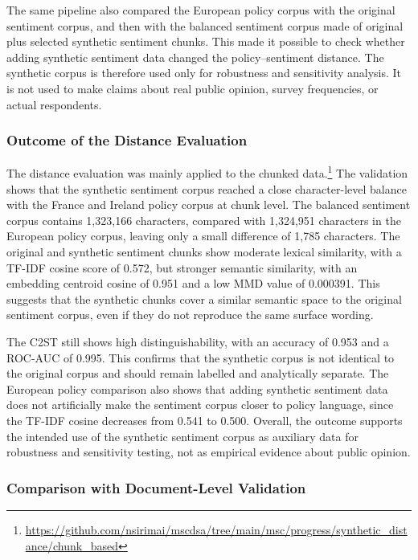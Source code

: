 \documentclass{article}
\begin{document}
The same pipeline also compared the European policy corpus with the original
sentiment corpus, and then with the balanced sentiment corpus made of original plus
selected synthetic sentiment chunks. This made it possible to check whether adding
synthetic sentiment data changed the policy--sentiment distance. The synthetic corpus
is therefore used only for robustness and sensitivity analysis. It is not used to
make claims about real public opinion, survey frequencies, or actual respondents.


\subsubsection*{Outcome of the Distance Evaluation}

The distance evaluation was mainly applied to the chunked
data.\footnote{\url{https://github.com/nsirimai/mscdsa/tree/main/msc/progress/synthetic_distance/chunk_based}}
The validation shows that the synthetic sentiment corpus reached a close
character-level balance with the France and Ireland policy corpus at chunk level. The
balanced sentiment corpus contains 1,323,166 characters, compared with 1,324,951
characters in the European policy corpus, leaving only a small difference of 1,785
characters. The original and synthetic sentiment chunks show moderate lexical
similarity, with a TF-IDF cosine score of 0.572, but stronger semantic similarity,
with an embedding centroid cosine of 0.951 and a low MMD value of 0.000391. This
suggests that the synthetic chunks cover a similar semantic space to the original
sentiment corpus, even if they do not reproduce the same surface wording.

The C2ST still shows high distinguishability, with an accuracy of 0.953 and a ROC-AUC
of 0.995. This confirms that the synthetic corpus is not identical to the original
corpus and should remain labelled and analytically separate. The European policy
comparison also shows that adding synthetic sentiment data does not artificially make
the sentiment corpus closer to policy language, since the TF-IDF cosine decreases
from 0.541 to 0.500. Overall, the outcome supports the intended use of the synthetic
sentiment corpus as auxiliary data for robustness and sensitivity testing, not as
empirical evidence about public opinion.

\subsubsection*{Comparison with Document-Level Validation}
\end{document}
